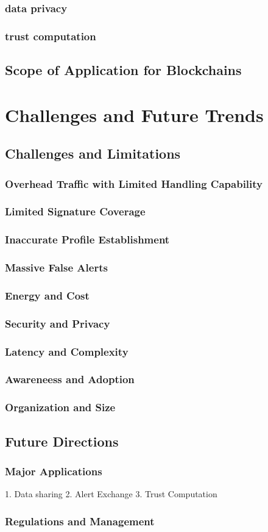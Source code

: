 \documentclass[12pt]{report}
\begin{document}
\subsection{data privacy}
\subsection{trust computation}
\section{Scope of Application for Blockchains}

\chapter{Challenges and Future Trends}
\section{Challenges and Limitations}
\subsection{Overhead Traffic with Limited Handling Capability}
\subsection{Limited Signature Coverage}
\subsection{Inaccurate Profile Establishment}
\subsection{Massive False Alerts}
\subsection{Energy and Cost}
\subsection{Security and Privacy}
\subsection{Latency and Complexity}
\subsection{Awareneess and Adoption}
\subsection{Organization and Size}
\section{Future Directions}
\subsection{Major Applications}
1. Data sharing
2. Alert Exchange
3. Trust Computation
\subsection{Regulations and Management}



\end{document}

